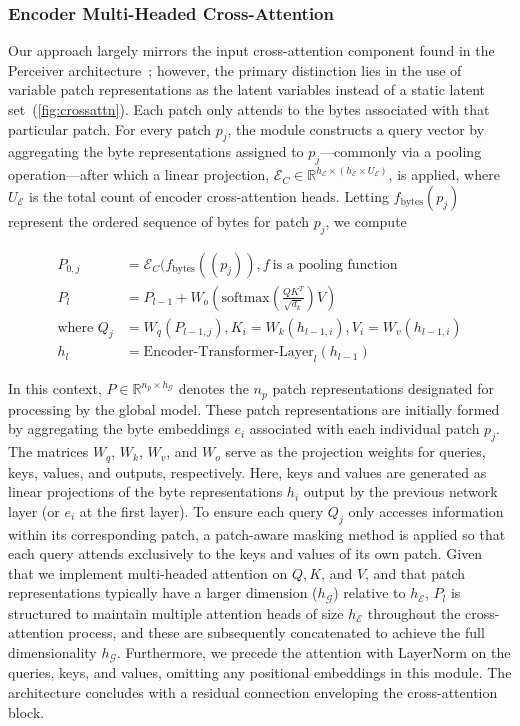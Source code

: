 \subsubsection{Encoder Multi-Headed Cross-Attention}
\label{sec:enc-cross-attn}
Our approach largely mirrors the input cross-attention component found in the Perceiver architecture~\citep{jaegle2021perceiver}; however, the primary distinction lies in the use of variable patch representations as the latent variables instead of a static latent set~(\autoref{fig:crossattn}). Each patch only attends to the bytes associated with that particular patch. For every patch $p_j$, the module constructs a query vector by aggregating the byte representations assigned to $p_j$—commonly via a pooling operation—after which a linear projection, $\mathcal{E}_{C} \in \mathbb{R}^{h_{\mathcal{E}} \times (h_{\mathcal{E}} \times U_{\mathcal{E}})}$, is applied, where $U_{\mathcal{E}}$ is the total count of encoder cross-attention heads. Letting $f_{\text{bytes}}(p_j)$ represent the ordered sequence of bytes for patch $p_j$, we compute

\begin{align}
P_{0,j} &= \mathcal{E}_{C}(f_\text{bytes}((p_j)), f~ \text{is a pooling function} \\
P_l &= P_{l-1} + W_o\left(\text{softmax}\left(\frac{QK^T}{\sqrt{d_k}}\right)V\right) \\
\text{where } Q_j &= W_q(P_{l-1,j}), K_i = W_k(h_{l-1,i}), V_i = W_v(h_{l-1,i}) \\
h_l &= \text{Encoder-Transformer-Layer}_l(h_{l-1})
\end{align}

In this context, $P \in \mathbb{R}^{n_p \times h_{\mathcal{G}}}$ denotes the $n_p$ patch representations designated for processing by the global model. These patch representations are initially formed by aggregating the byte embeddings $e_i$ associated with each individual patch $p_j$. The matrices $W_q$, $W_k$, $W_v$, and $W_o$ serve as the projection weights for queries, keys, values, and outputs, respectively. Here, keys and values are generated as linear projections of the byte representations $h_i$ output by the previous network layer (or $e_i$ at the first layer). To ensure each query $Q_j$ only accesses information within its corresponding patch, a patch-aware masking method is applied so that each query attends exclusively to the keys and values of its own patch. Given that we implement multi-headed attention on $Q, K$, and $V$, and that patch representations typically have a larger dimension ($h_{\mathcal{G}}$) relative to $h_{\mathcal{E}}$, $P_l$ is structured to maintain multiple attention heads of size $h_{\mathcal{E}}$ throughout the cross-attention process, and these are subsequently concatenated to achieve the full dimensionality $h_{\mathcal{G}}$. Furthermore, we precede the attention with LayerNorm on the queries, keys, and values, omitting any positional embeddings in this module. The architecture concludes with a residual connection enveloping the cross-attention block.

